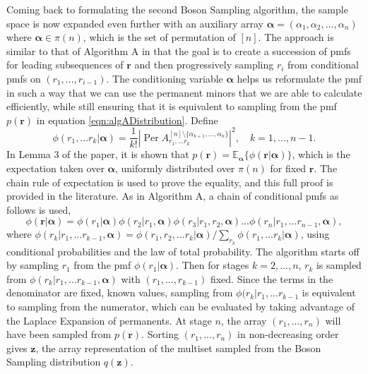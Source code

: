 \documentclass[11pt]{article}
\theoremstyle{theorem}
\theoremstyle{remark}
\theoremstyle{plain}
\theoremstyle{definition}
\DeclareMathOperator*{\Per}{\mathrm{Per}}
\begin{document}
Coming back to formulating the second Boson Sampling algorithm, the sample space is now expanded even further with an auxiliary array $\mathbf{\alpha} = (\alpha_1, \alpha_2, ... , \alpha_n)$ where $\mathbf{\alpha} \in \pi(n)$, which is the set of permutation of $[n]$. The approach is similar to that of Algorithm A in that the goal is to create a succession of pmfs for leading subsequences of $\mathbf{r}$ and then progressively sampling $r_i$ from conditional pmfs on $(r_1, ... , r_{i-1})$. The conditioning variable $\mathbf{\alpha}$ helps us reformulate the pmf in such a way that we can use the permanent minors that we are able to calculate efficiently, while still ensuring that it is equivalent to sampling from the pmf $p(\mathbf{r})$ in equation \ref{eqn:algADistribution}.
Define
\begin{equation}
\phi(r_1, ... r_k | \mathbf{\alpha}) = \frac{1}{k!} \left| \Per A_{r_1, ... r_k}^{[n] \setminus \{\alpha_{k+1},  ... , \alpha_n\}} \right|^2, \quad k = 1, ... , n-1.
\end{equation}
In Lemma 3 of the paper, it is shown that $p(\mathbf{r}) = \mathbb{E}_{\mathbf{\alpha}}\{\phi(\mathbf{r} | \mathbf{\alpha})\}$, which is the expectation taken over $\mathbf{\alpha}$, uniformly distributed over $\pi(n)$ for fixed $\mathbf{r}$. The chain rule of expectation is used to prove the equality, and this full proof is provided in the literature. As in Algorithm A, a chain of conditional pmfs as follows is used,
\begin{equation} \label{eqn:algBChainRule}
\phi(\mathbf{r} | \mathbf{\alpha}) = \phi(r_1 | \mathbf{\alpha}) \phi(r_2 | r_1, \mathbf{\alpha}) \phi(r_3 | r_1, r_2, \mathbf{\alpha}) ... \phi(r_n | r_1, ... r_{n-1}, \mathbf{\alpha}), 
\end{equation}
where $\phi(r_k | r_1, ... r_{k-1}, \mathbf{\alpha}) = \phi(r_1, r_2, ... r_k | \mathbf{\alpha}) / \sum_{r_k} \phi(r_1, ... r_k | \mathbf{\alpha})$, using conditional probabilities and the law of total probability. The algorithm starts off by sampling $r_1$ from the pmf $\phi(r_1 | \mathbf{\alpha})$. Then for stages $k = 2 , ... , n$, $r_k$ is sampled from $\phi(r_k | r_1, ... r_{k-1}, \mathbf{\alpha})$ with $(r_1, ... , r_{k-1})$ fixed. Since the terms in the denominator are fixed, known values, sampling from $\phi(r_k | r_1, ... r_{k-1}$ is equivalent to sampling from the numerator, which can be evaluated by taking advantage of the Laplace Expansion of permanents. At stage $n$, the array $(r_1, ... , r_n)$ will have been sampled from $p(\mathbf{r})$. Sorting $(r_1, ... , r_n)$ in non-decreasing order gives $\mathbf{z}$, the array representation of the multiset sampled from the Boson Sampling distribution $q(\mathbf{z})$.
\end{document}
